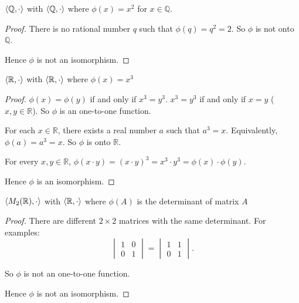 \begin{exercise}
    $\left\langle{\mathbb{Q},\cdot}\right\rangle$ with $\left\langle{\mathbb{Q},\cdot}\right\rangle$ where $\phi(x) = x^{2}$ for $x\in\mathbb{Q}$.
\end{exercise}

\begin{proof}
    There is no rational number $q$ such that $\phi(q) = q^{2} = 2$. So $\phi$ is not onto $\mathbb{Q}$.

    Hence $\phi$ is not an isomorphism.
\end{proof}

\begin{exercise}
    $\left\langle{\mathbb{R},\cdot}\right\rangle$ with $\left\langle{\mathbb{R},\cdot}\right\rangle$ where $\phi(x) = x^{3}$
\end{exercise}

\begin{proof}
    $\phi(x) = \phi(y)$ if and only if $x^{3} = y^{3}$. $x^{3} = y^{3}$ if and only if $x = y$ ($x, y\in\mathbb{R}$). So $\phi$ is an one-to-one function.

    For each $x\in\mathbb{R}$, there exists a real number $a$ such that $a^{3} = x$. Equivalently, $\phi(a) = a^{3} = x$. So $\phi$ is onto $\mathbb{R}$.

    For every $x, y\in\mathbb{R}$, $\phi(x\cdot y) = {(x\cdot y)}^{3} = x^{3}\cdot y^{3} = \phi(x)\cdot\phi(y)$.

    Hence $\phi$ is an isomorphism.
\end{proof}

\begin{exercise}
    $\left\langle{M_{2}(\mathbb{R}), \cdot}\right\rangle$ with $\left\langle{\mathbb{R},\cdot}\right\rangle$ where $\phi(A)$ is the determinant of matrix $A$
\end{exercise}

\begin{proof}
    There are different $2\times 2$ matrices with the same determinant. For examples:
    \[
        \begin{vmatrix}
            1 & 0 \\
            0 & 1
        \end{vmatrix}
        =
        \begin{vmatrix}
            1 & 1 \\
            0 & 1
        \end{vmatrix}.
    \]

    So $\phi$ is not an one-to-one function.

    Hence $\phi$ is not an isomorphism.
\end{proof}

